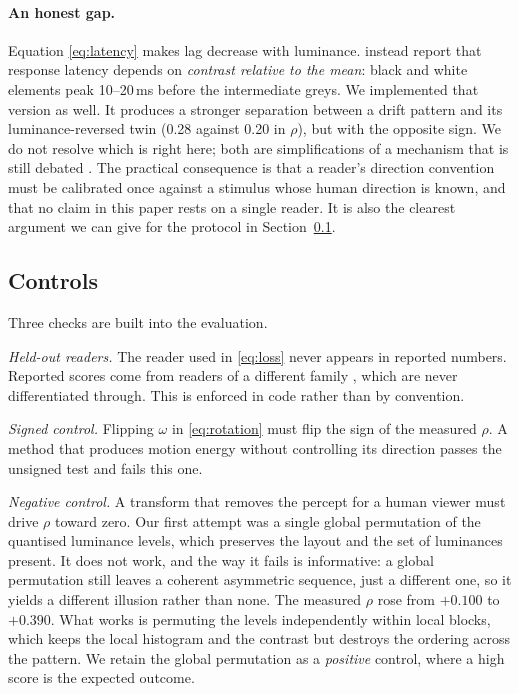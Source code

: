 \paragraph{An honest gap.} Equation \eqref{eq:latency} makes lag decrease with
luminance. \citet{conway2005neural} instead report that response latency
depends on \emph{contrast relative to the mean}: black and white elements peak
10--20\,ms before the intermediate greys. We implemented that version as well.
It produces a stronger separation between a drift pattern and its
luminance-reversed twin (0.28 against 0.20 in $\rho$), but with the opposite
sign. We do not resolve which is right here; both are simplifications of a
mechanism that is still debated
\cite{conway2005neural,backus2005illusory,fermuller2010causal}. The practical
consequence is that a reader's direction convention must be calibrated once
against a stimulus whose human direction is known, and that no claim in this
paper rests on a single reader. It is also the clearest argument we can give
for the protocol in Section~\ref{sec:controls}.

\subsection{Controls}
\label{sec:controls}

Three checks are built into the evaluation.

\emph{Held-out readers.} The reader used in \eqref{eq:loss} never appears in
reported numbers. Reported scores come from readers of a different family
\cite{wang2024searaft,lotter2017prednet}, which are never differentiated
through. This is enforced in code rather than by convention.

\emph{Signed control.} Flipping $\omega$ in \eqref{eq:rotation} must flip the
sign of the measured $\rho$. A method that produces motion energy without
controlling its direction passes the unsigned test and fails this one.

\emph{Negative control.} A transform that removes the percept for a human
viewer must drive $\rho$ toward zero. Our first attempt was a single global
permutation of the quantised luminance levels, which preserves the layout and
the set of luminances present. It does not work, and the way it fails is
informative: a global permutation still leaves a coherent asymmetric sequence,
just a different one, so it yields a different illusion rather than none. The
measured $\rho$ rose from $+0.100$ to $+0.390$. What works is permuting the
levels independently within local blocks, which keeps the local histogram and
the contrast but destroys the ordering across the pattern. We retain the global
permutation as a \emph{positive} control, where a high score is the expected
outcome.

